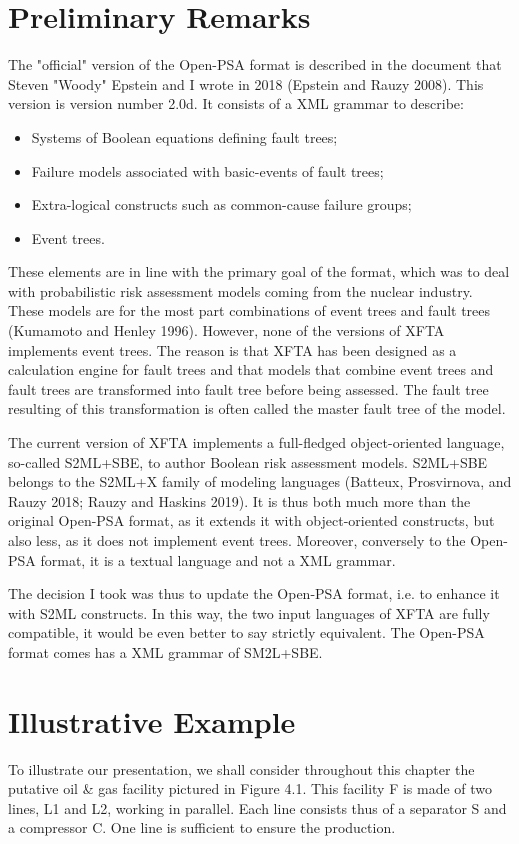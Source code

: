 \section{Preliminary Remarks}
The "official" version of the Open-PSA format is described in the document that Steven "Woody" Epstein and I wrote in 2018 (Epstein and Rauzy 2008). This version is version number 2.0d. It consists of a XML grammar to describe:
\begin{itemize}
    \item Systems of Boolean equations defining fault trees;
    \item Failure models associated with basic-events of fault trees;
    \item Extra-logical constructs such as common-cause failure groups;
    \item Event trees.
\end{itemize}

These elements are in line with the primary goal of the format, which was to deal with probabilistic risk assessment models coming from the nuclear industry. These models are for the most part combinations of event trees and fault trees (Kumamoto and Henley 1996). However, none of the versions of XFTA implements event trees. The reason is that XFTA has been designed as a calculation engine for fault trees and that models that combine event trees and fault trees are transformed into fault tree before being assessed. The fault tree resulting of this transformation is often called the master fault tree of the model.

The current version of XFTA implements a full-fledged object-oriented language, so-called S2ML+SBE, to author Boolean risk assessment models. S2ML+SBE belongs to the S2ML+X family of modeling languages (Batteux, Prosvirnova, and Rauzy 2018; Rauzy and Haskins 2019). It is thus both much more than the original Open-PSA format, as it extends it with object-oriented constructs, but also less, as it does not implement event trees. Moreover, conversely to the Open-PSA format, it is a textual language and not a XML grammar.

The decision I took was thus to update the Open-PSA format, i.e. to enhance it with S2ML constructs. In this way, the two input languages of XFTA are fully compatible, it would be even better to say strictly equivalent. The Open-PSA format comes has a XML grammar of SM2L+SBE.

\section{Illustrative Example}
To illustrate our presentation, we shall consider throughout this chapter the putative oil \& gas facility pictured in Figure 4.1. This facility F is made of two lines, L1 and L2, working in parallel. Each line consists thus of a separator S and a compressor C. One line is sufficient to ensure the production.

